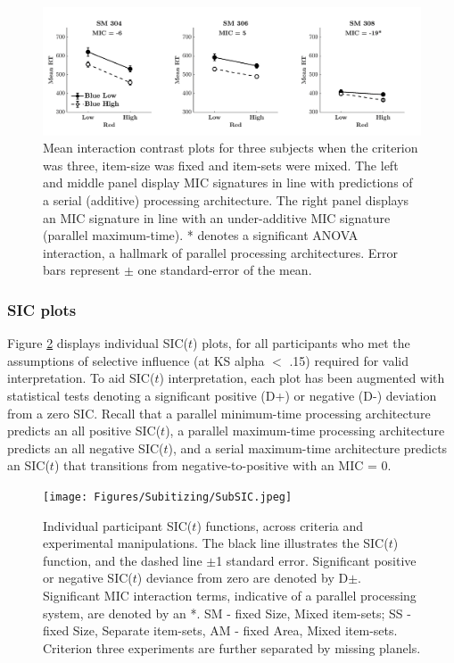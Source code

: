 \begin{figure}[hbt]
\centering \includegraphics[width=\linewidth]{Figures/Subitizing/SubMIC.jpg}
\caption{Mean interaction contrast plots for three subjects when the criterion was three, item-size was fixed and item-sets were mixed. The left and middle panel display MIC signatures in line with predictions of a serial (additive) processing architecture. The right panel displays an MIC signature in line with an under-additive MIC signature (parallel maximum-time). * denotes a significant ANOVA interaction, a hallmark of parallel processing architectures. Error bars represent $\pm$ one standard-error of the mean.}
\label{fig:subMIC1}
\end{figure}


\subsubsection{SIC plots}
Figure \ref{fig:subSIC} displays individual SIC($t$) plots, for all participants who met the assumptions of selective influence (at KS alpha $<$ .15) required for valid interpretation. To aid SIC($t$) interpretation, each plot has been augmented with statistical tests \cite{houpt2010statSIC} denoting a significant positive (D+) or negative (D-) deviation from a zero SIC. Recall that a parallel minimum-time processing architecture predicts an all positive SIC($t$), a parallel maximum-time processing architecture predicts an all negative SIC($t$), and a serial maximum-time architecture predicts an SIC($t$) that transitions from negative-to-positive with an MIC = 0. 

\begin{figure}[hbt]
\centering \texttt{[image: Figures/Subitizing/SubSIC.jpeg]}
\caption{Individual participant SIC($t$) functions, across criteria and experimental manipulations. The black line illustrates the SIC($t$) function, and the dashed line $\pm$1 standard error. Significant positive or negative SIC($t$) deviance from zero are denoted by D$\pm$. Significant MIC interaction terms, indicative of a parallel processing system, are denoted by an *. SM - fixed Size, Mixed item-sets; SS - fixed Size, Separate item-sets, AM - fixed Area, Mixed item-sets. Criterion three experiments are further separated by missing planels.}
\label{fig:subSIC}
\end{figure}

